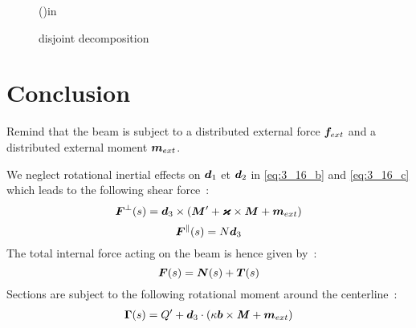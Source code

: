 \begin{figure}[p]
\begin{fullpage}
\begin{algorithm}[H]
{\BlankLine
{}
\ForEach(){\Node in \Model}{
	
	
}
\BlankLine
{}

}{\KwRet}

\caption{disjoint decomposition}\label{algo_disjdecomp}
\end{algorithm}
\end{fullpage}
\end{figure}
\DecMargin{2em}


\clearpage

\section{Conclusion}
Remind that the beam is subject to a distributed external force $\boldsymbol{f}_{ext}$ and a distributed external moment $\boldsymbol{m}_{ext}$.

We neglect rotational inertial effects on $\boldsymbol{d}_1$ et $\boldsymbol{d}_2$ in \eqref{eq:3_16_b} and \eqref{eq:3_16_c} which leads to the following shear force~:
\begin{equation}
	\boldsymbol{F}^{\perp}(s) = \boldsymbol{d}_3 \times (\boldsymbol{M}' + \boldsymbol{\varkappa} \times \boldsymbol{M} + \boldsymbol{m}_{ext})
\end{equation}
\begin{equation}
	\boldsymbol{F}^{\parallel}(s) = N \boldsymbol{d}_3
\end{equation}
 The total internal force acting on the beam is hence given by~:
\begin{equation}
	\boldsymbol{F}(s) = \boldsymbol{N}(s) + \boldsymbol{T}(s)
\end{equation}
Sections are subject to the following rotational moment around the centerline~:
\begin{equation}
	\begin{aligned}
	\boldsymbol{\Gamma}(s) = Q' + \boldsymbol{d}_3 \cdot ( \kappa\boldsymbol{b} \times \boldsymbol{\mathit{M}} + \boldsymbol{m}_{ext})
	\end{aligned}
\end{equation}


